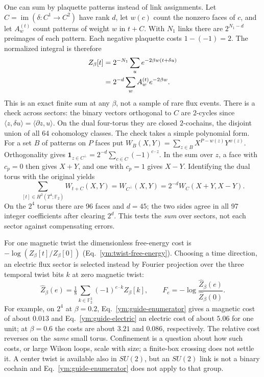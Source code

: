 One can sum by plaquette patterns instead of link assignments. Let
$C=\operatorname{im}(\delta:C^1\to C^2)$ have rank $d$, let $w(c)$ count the
nonzero faces of $c$, and let $A_w^{(t)}$ count patterns of weight $w$ in
$t+C$. With $N_1$ links there are $2^{N_1-d}$ preimages of each pattern.
Each negative plaquette costs $1-(-1)=2$. The normalized integral is therefore
\begin{align}
 Z_\beta[t]&=2^{-N_1}\sum_u e^{-2\beta w(t+\delta u)}\notag\\
 &=2^{-d}\sum_w A_w^{(t)}e^{-2\beta w}.\label{ym:guide-enumerator}
\end{align}
This is an exact finite sum at any $\beta$, not a sample of rare flux events.
There is a check across sectors: the binary vectors orthogonal to $C$ are
$2$-cycles since $\langle z,\delta u\rangle=\langle\partial z,u\rangle$.
On the dual four-torus they are closed $2$-cochains, the disjoint union
of all 64 cohomology classes. The check takes a simple polynomial form. For a set $B$ of patterns on
$P$ faces put $W_B(X,Y)=\sum_{z\in B}X^{P-w(z)}Y^{w(z)}$. Orthogonality
gives $\mathbf 1_{z\in C^\perp}=2^{-d}\sum_{c\in C}(-1)^{c\cdot z}$.
In the sum over $z$, a face with $c_p=0$ then gives $X+Y$, and one with
$c_p=1$ gives $X-Y$. Identifying the dual torus with the original yields
\begin{equation}\label{ym:guide-duality}
 \sum_{[t]\in H^2(T^4;\mathbb F_2)} W_{t+C}(X,Y)
 = W_{C^\perp}(X,Y)=2^{-d}W_C(X+Y,X-Y).
\end{equation}
On the $2^4$ torus there are 96 faces and $d=45$; the two sides agree in
all 97 integer coefficients after clearing $2^d$. This tests the
\emph{sum} over sectors, not each sector against compensating errors.

For one magnetic twist the dimensionless free-energy cost is
$-\log(Z_\beta[t]/Z_\beta[0])$ (Eq.~\eqref{ym:twist-free-energy}). Choosing
a time direction, an electric flux sector is selected instead by Fourier
projection over the three temporal twist bits $k$ at zero magnetic twist:
\begin{equation}\label{ym:guide-electric}
 \widehat Z_\beta(e)=\tfrac18\sum_{k\in\mathbb F_2^3}(-1)^{e\cdot k}Z_\beta[k],
 \qquad F_e=-\log\frac{\widehat Z_\beta(e)}{\widehat Z_\beta(0)} .
\end{equation}
For example, on $2^4$ at $\beta=0.2$, Eq.~\eqref{ym:guide-enumerator} gives
a magnetic cost of about $0.013$ and Eq.~\eqref{ym:guide-electric} an electric
cost of about $5.06$ for one unit; at $\beta=0.6$ the costs are about $3.21$
and $0.086$, respectively. The relative cost reverses on the \emph{same}
small torus. Confinement is a question about how such costs, or large Wilson
loops, scale with size; a finite-box crossing does not settle it. A center
twist is available also in $SU(2)$, but an $SU(2)$ link is not a binary
cochain and Eq.~\eqref{ym:guide-enumerator} does not apply to that group.

